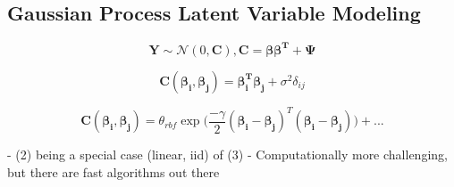 \documentclass[english, 11pt]{article}\usepackage[]{graphicx}\usepackage[]{color}
\begin{document}
\subsection{Gaussian Process Latent Variable Modeling}

\begin{equation}
\mathbf{Y} \sim  \mathcal{N} (0, \mathbf{C}), \mathbf{C} = \mathbf{\beta\beta^T }+ \mathbf{\Psi}
\end{equation}

\begin{equation}
\mathbf{C}(\mathbf{\beta_i},\mathbf{\beta_j}) = \mathbf{\beta_i^T}\mathbf{\beta_j} + \sigma^2\delta_{ij}
\end{equation}

\begin{equation}
\mathbf{C}(\mathbf{\beta_i},\mathbf{\beta_j}) = \theta_{rbf} \exp \Big(\frac{-\gamma}{2}(\mathbf{\beta_i}-\mathbf{\beta_j})^{T}(\mathbf{\beta_i}-\mathbf{\beta_j})  \Big) + ...
\end{equation}


- (2) being a special case (linear, iid) of (3)
- Computationally more challenging, but there are fast algorithms out there






\end{document}
